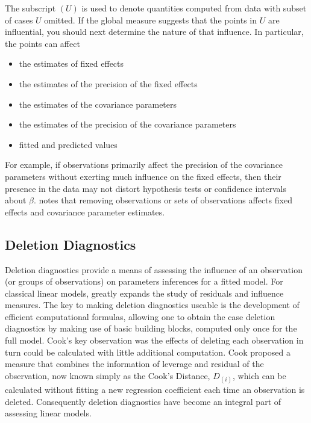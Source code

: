 \documentclass[12pt, a4paper]{report}
\theoremstyle{plain}
\theoremstyle{definition}
\theoremstyle{remark}
\begin{document}
	The subscript $(U)$ is used to denote quantities computed from data with subset of cases $U$ omitted.
	If the global measure suggests that the points in $U$ are influential, you should next determine the nature of
	that influence. In particular, the points can affect
	\begin{itemize}
		\item the estimates of fixed effects
		\item the estimates of the precision of the fixed effects
		\item the estimates of the covariance parameters
		\item the estimates of the precision of the covariance parameters
		\item fitted and predicted values
	\end{itemize}	
	
	For example, if observations primarily affect the precision of the covariance parameters without exerting much influence on the fixed effects, then their presence in the data may not distort hypothesis
	tests or confidence intervals about $\beta$. 
	\citet{schabenberger} notes that removing observations or sets of observations affects fixed effects and covariance parameter estimates.
	
	
	
	
	
	\subsection{Deletion Diagnostics}
	
	
	
	Deletion diagnostics provide a means of assessing the influence of an observation (or groups of observations) on parameters inferences for a fitted model. For classical linear models, \citet{cook77} greatly expands the study of residuals and influence measures. The key to making deletion diagnostics useable is the development of efficient computational formulas, allowing one to obtain the  case deletion diagnostics by making use of basic building blocks, computed only once for the full model.
	Cook's key observation was the effects of deleting each observation in turn could be calculated with little additional computation. Cook proposed a measure that combines the information of leverage and residual of the observation, now known simply as the Cook's Distance, $D_{(i)}$, which can be calculated without fitting a new regression coefficient each time an observation is deleted. Consequently deletion diagnostics have become an integral part of assessing linear models.
	
\end{document}
